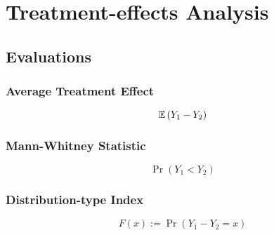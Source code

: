\chapter{Treatment-effects Analysis}

\section{Evaluations}

\subsection{Average Treatment Effect}

\begin{definition}
	\begin{equation}
		\mathbb{E}\left(Y_{1}-Y_{2}\right)
	\end{equation}
\end{definition}

\subsection{Mann-Whitney Statistic}

\begin{definition}
	\begin{equation}
		\Pr\left(Y_{1}<Y_{2}\right)
	\end{equation}
\end{definition}

\subsection{Distribution-type Index}

\begin{definition}
	\begin{equation}
		F(x):=\Pr\left(Y_{1}-Y_{2}=x\right)
	\end{equation}
\end{definition}
